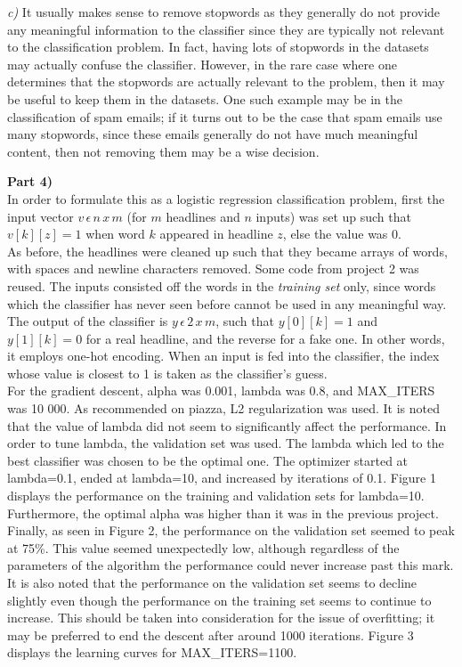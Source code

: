\documentclass{article}
\begin{document}
\textit{c)} It usually makes sense to remove stopwords as they generally do not provide any meaningful information to the classifier since they are typically not relevant to the classification problem. In fact, having lots of stopwords in the datasets may actually confuse the classifier. However, in the rare case where one determines that the stopwords are actually relevant to the problem, then it may be useful to keep them in the datasets. One such example may be in the classification of spam emails; if it turns out to be the case that spam emails use many stopwords, since these emails generally do not have much meaningful content, then not removing them may be a wise decision.\newpage

\textbf{Part 4)}\\
In order to formulate this as a logistic regression classification problem, first the input vector $v\,\epsilon\, n\,x\,m$ (for $m$ headlines and $n$ inputs) was set up such that $v[k][z]=1$ when word $k$ appeared in headline $z$, else the value was 0.\\

As before, the headlines were cleaned up such that they became arrays of words, with spaces and newline characters removed. Some code from project 2 was reused. The inputs consisted off the words in the \textit{training set} only, since words which the classifier has never seen before cannot be used in any meaningful way. The output of the classifier is $y\,\epsilon\, 2\,x\,m$, such that $y[0][k]=1$ and $y[1][k]=0$ for a real headline, and the reverse for a fake one. In other words, it employs one-hot encoding. When an input is fed into the classifier, the index whose value is closest to 1 is taken as the classifier's guess.\\

For the gradient descent, alpha was 0.001, lambda was 0.8, and MAX\_ITERS was 10 000. As recommended on piazza, L2 regularization was used. It is noted that the value of lambda did not seem to significantly affect the performance. In order to tune lambda, the validation set was used. The lambda which led to the best classifier was chosen to be the optimal one. The optimizer started at lambda=0.1, ended at lambda=10, and increased by iterations of 0.1. Figure 1 displays the performance on the training and validation sets for lambda=10. Furthermore, the optimal alpha was higher than it was in the previous project.\\

Finally, as seen in Figure 2, the performance on the validation set seemed to peak at 75\%. This value seemed unexpectedly low, although regardless of the parameters of the algorithm the performance could never increase past this mark. It is also noted that the performance on the validation set seems to decline slightly even though the performance on the training set seems to continue to increase. This should be taken into consideration for the issue of overfitting; it may be preferred to end the descent after around 1000 iterations. Figure 3 displays the learning curves for MAX\_ITERS=1100.
\end{document}
